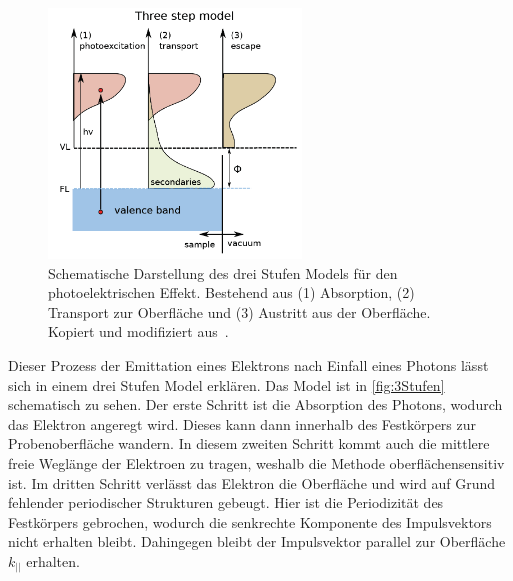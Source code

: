         \begin{figure}
            \centering
            \includegraphics[width=0.6\textwidth]{3Stufen}
            \caption{Schematische Darstellung des drei Stufen Models für den photoelektrischen Effekt.
            Bestehend aus (1) Absorption, (2) Transport zur Oberfläche und (3) Austritt aus der Oberfläche.
            Kopiert und modifiziert aus~\cite{zhang_synchrotron_2018}.}
            \label{fig:3Stufen}
        \end{figure}
        Dieser Prozess der Emittation eines Elektrons nach Einfall eines Photons lässt sich in einem drei Stufen Model erklären.
        Das Model ist in \autoref{fig:3Stufen} schematisch zu sehen.
        Der erste Schritt ist die Absorption des Photons, wodurch das Elektron angeregt wird. 
        Dieses kann dann innerhalb des Festkörpers zur Probenoberfläche wandern.
        In diesem zweiten Schritt kommt auch die mittlere freie Weglänge der Elektroen zu tragen, weshalb die Methode oberflächensensitiv ist.
        Im dritten Schritt verlässt das Elektron die Oberfläche und wird auf Grund fehlender periodischer Strukturen gebeugt.
        Hier ist die Periodizität des Festkörpers gebrochen, wodurch die senkrechte Komponente des Impulsvektors nicht erhalten bleibt.
        Dahingegen bleibt der Impulsvektor parallel zur Oberfläche $k_{||}$ erhalten.

